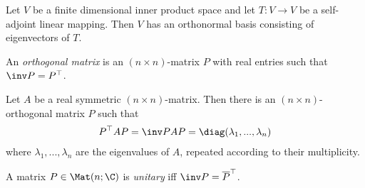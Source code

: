 \documentclass{article}
\begin{document}
\begin{theorem}
	Let $V$ be a finite dimensional inner product space and let $T:V\to V$ be a self-adjoint linear 
	mapping. Then $V$ has an orthonormal basis consisting of eigenvectors of $T$.	
\end{theorem}

\begin{definition}
	An \emph{orthogonal matrix} is an $(n\times n)$-matrix $P$ with real entries such that $\inv P=P^\top$.
\end{definition}

\begin{corollary}
	Let $A$ be a real symmetric $(n\times n)$-matrix. Then there is an $(n\times n)$-orthogonal matrix $P$
	such that 
	\begin{align*}
		P^\top AP = \inv PAP = \diag(\lambda_1,...,\lambda_n)
	\end{align*}
	where $\lambda_1,...,\lambda_n$ are the eigenvalues of $A$, repeated according to their multiplicity.
\end{corollary}

\begin{definition}
	A matrix $P\in\Mat(n;\C)$ is \emph{unitary} iff $\inv P=\overline{P}^\top$.
\end{definition}
\end{document}
